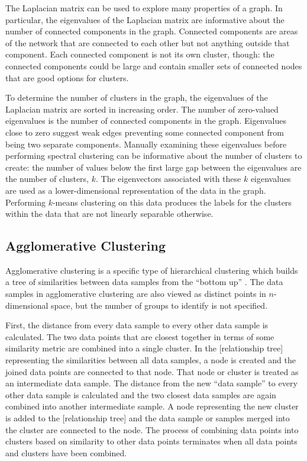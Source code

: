 The Laplacian matrix can be used to explore many properties of a graph. In particular, the eigenvalues of the Laplacian matrix are informative about the number of connected components in the graph. Connected components are areas of the network that are connected to each other but not anything outside that component. Each connected component is not its own cluster, though: the connected components could be large and contain smaller sets of connected nodes that are good options for clusters.

To determine the number of clusters in the graph, the eigenvalues of the Laplacian matrix are sorted in increasing order. The number of zero-valued eigenvalues is the number of connected components in the graph. Eigenvalues close to zero suggest weak edges preventing some connected component from being two separate components. Manually examining these eigenvalues before performing spectral clustering can be informative about the number of clusters to create: the number of values below the first large gap between the eigenvalues are the number of clusters, $k$. The eigenvectors associated with these $k$ eigenvalues are used as a lower-dimensional representation of the data in the graph. Performing $k$-means clustering on this data produces the labels for the clusters within the data that are not linearly separable otherwise.


\subsection{Agglomerative Clustering}

Agglomerative clustering is a specific type of hierarchical clustering which builds a tree of similarities between data samples from the ``bottom up'' \cite{Ward1963}. The data samples in agglomerative clustering are also viewed as distinct points in $n$-dimensional space, but the number of groups to identify is not specified. 

First, the distance from every data sample to every other data sample is calculated. The two data points that are closest together in terms of some similarity metric are combined into a single cluster. In the [relationship tree] representing the similarities between all data samples, a node is created and the joined data points are connected to that node. That node or cluster is treated as an intermediate data sample. The distance from the new ``data sample'' to every other data sample is calculated and the two closest data samples are again combined into another intermediate sample. A node representing the new cluster is added to the [relationship tree] and the data sample or samples merged into the cluster are connected to the node. The process of combining data points into clusters based on similarity to other data points terminates when all data points and clusters have been combined. 


